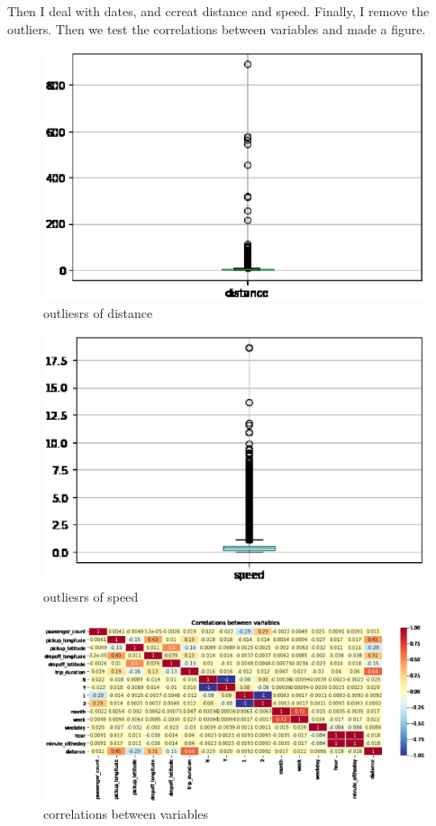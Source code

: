 Then I deal with dates, and ccreat distance and speed. Finally, I remove the outliers. Then we test the correlations between variables and made a figure.
\begin{figure}[h]
	\centering
	\includegraphics[scale=0.3]{distance.eps}
	\caption{outliesrs of distance}
\end{figure}
\begin{figure}[h]
	\centering
	\includegraphics[scale=0.3]{speed.eps}
	\caption{outliesrs of speed}
\end{figure}
\begin{figure}[h]
	\centering
	\includegraphics[scale=0.3]{correlations between variables.eps}
	\caption{correlations between variables}
\end{figure}

